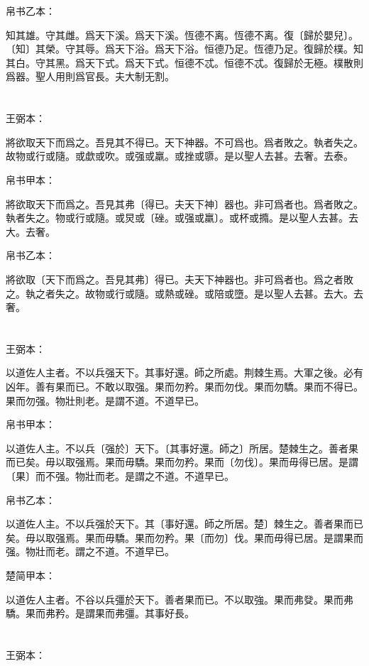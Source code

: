 \documentclass[a5paper]{ctexbook}
\begin{document}
    帛书乙本：

    知其雄。守其雌。爲天下溪。爲天下溪。恆德不离。恆德不离。復〔歸於嬰兒〕。〔知〕其榮。守其辱。爲天下浴。爲天下浴。恒德乃足。恆德乃足。復歸於樸。知其白。守其黑。爲天下式。爲天下式。恒德不忒。恒德不忒。復歸於无極。樸散則爲器。聖人用則爲官長。夫大制无割。

    \chapter{}
    王弼本：

    將欲取天下而爲之。吾見其不得已。天下神器。不可爲也。爲者敗之。執者失之。故物或行或隨。或歔或吹。或强或羸。或挫或隳。是以聖人去甚。去奢。去泰。

    
    帛书甲本：

    將欲取天下而爲之。吾見其弗〔得已。夫天下神〕器也。非可爲者也。爲者敗之。執者失之。物或行或隨。或炅或〔䂳。或强或羸〕。或杯或撱。是以聖人去甚。去大。去奢。

    帛书乙本：

    將欲取〔天下而爲之。吾見其弗〕得已。夫天下神器也。非可爲者也。爲之者敗之。執之者失之。故物或行或隨。或熱或䂳。或陪或墮。是以聖人去甚。去大。去奢。

    \chapter{}
    王弼本：

    以道佐人主者。不以兵强天下。其事好還。師之所處。荆棘生焉。大軍之後。必有凶年。善有果而已。不敢以取强。果而勿矜。果而勿伐。果而勿驕。果而不得已。果而勿强。物壯則老。是謂不道。不道早已。

    
    帛书甲本：

    以道佐人主。不以兵〔强於〕天下。〔其事好還。師之〕所居。楚棘生之。善者果而已矣。毋以取强焉。果而毋驕。果而勿矜。果而〔勿伐〕。果而毋得已居。是謂〔果〕而不强。物壯而老。是謂之不道。不道早已。

    帛书乙本：

    以道佐人主。不以兵强於天下。其〔事好還。師之所居。楚〕棘生之。善者果而已矣。毋以取强焉。果而毋驕。果而勿矜。果〔而勿〕伐。果而毋得已居。是謂果而强。物壯而老。謂之不道。不道早已。

    楚简甲本：

    以道佐人主者。不谷以兵彊於天下。善者果而已。不以取強。果而弗癹。果而弗驕。果而弗矜。是謂果而弗彊。其事好長。

    \chapter{}
    王弼本：
\end{document}
